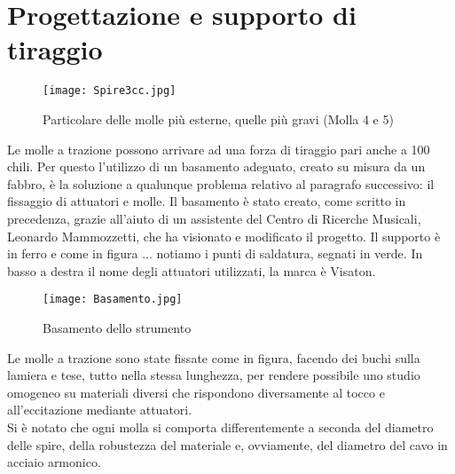\section{Progettazione e supporto di tiraggio}

\begin{figure}[htbp]
\begin{center}
\texttt{[image: Spire3cc.jpg]}
\caption{Particolare delle molle più esterne, quelle più gravi (Molla 4 e 5)}
\label{default}
\end{center}
\end{figure}
Le molle a trazione possono arrivare ad una forza di tiraggio pari anche a 100 chili. Per questo l'utilizzo di un basamento adeguato, creato su misura da un fabbro, è la soluzione a qualunque problema relativo al paragrafo successivo: il fissaggio di attuatori e molle.
Il basamento è stato creato, come scritto in precedenza, grazie all'aiuto di un assistente del Centro di Ricerche Musicali, Leonardo Mammozzetti, che ha visionato e modificato il progetto. Il supporto è in ferro e come in figura ... notiamo i punti di saldatura, segnati in verde. In basso a destra il nome degli attuatori utilizzati, la marca è Visaton.
\begin{figure}[htbp]
\begin{center}
\texttt{[image: Basamento.jpg]}
\caption{Basamento dello strumento}
\label{default}
\end{center}
\end{figure}
Le molle a trazione sono state fissate come in figura, facendo dei buchi sulla lamiera e tese, tutto nella stessa lunghezza, per rendere possibile uno studio omogeneo su materiali diversi che rispondono diversamente al tocco e all'eccitazione mediante attuatori.\\
Si è notato che ogni molla si comporta differentemente a seconda del diametro delle spire, della robustezza del materiale e, ovviamente, del diametro del cavo in acciaio armonico.
%

